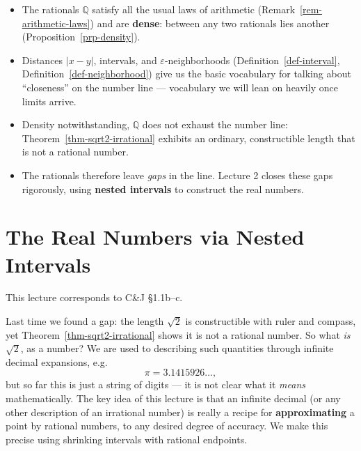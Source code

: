 \documentclass[
  letterpaper,
  DIV=11,
  numbers=noendperiod]{scrreprt}
\providecommand{\tightlist}{%
  \setlength{\itemsep}{0pt}\setlength{\parskip}{0pt}}
\theoremstyle{plain}
\theoremstyle{plain}
\theoremstyle{definition}
\theoremstyle{definition}
\theoremstyle{definition}
\theoremstyle{plain}
\theoremstyle{plain}
\theoremstyle{remark}
\begin{document}
\begin{itemize}
\tightlist
\item
  The rationals \(\mathbb{Q}\) satisfy all the usual laws of arithmetic
  (Remark~\ref{rem-arithmetic-laws}) and are \textbf{dense}: between any
  two rationals lies another (Proposition~\ref{prp-density}).
\item
  Distances \(|x-y|\), intervals, and \(\varepsilon\)-neighborhoods
  (Definition~\ref{def-interval}, Definition~\ref{def-neighborhood})
  give us the basic vocabulary for talking about ``closeness'' on the
  number line --- vocabulary we will lean on heavily once limits arrive.
\item
  Density notwithstanding, \(\mathbb{Q}\) does not exhaust the number
  line: Theorem~\ref{thm-sqrt2-irrational} exhibits an ordinary,
  constructible length that is not a rational number.
\item
  The rationals therefore leave \emph{gaps} in the line. Lecture 2
  closes these gaps rigorously, using \textbf{nested intervals} to
  construct the real numbers.
\end{itemize}

\chapter{The Real Numbers via Nested
Intervals}\label{the-real-numbers-via-nested-intervals}

\begin{tcolorbox}[enhanced jigsaw, arc=.35mm, bottomrule=.15mm, bottomtitle=1mm, breakable, colback=white, colbacktitle=quarto-callout-note-color!10!white, colframe=quarto-callout-note-color-frame, coltitle=black, left=2mm, leftrule=.75mm, opacityback=0, opacitybacktitle=0.6, rightrule=.15mm, title={Companion reading}, titlerule=0mm, toprule=.15mm, toptitle=1mm]

This lecture corresponds to C\&J §1.1b--c.

\end{tcolorbox}

Last time we found a gap: the length \(\sqrt2\) is constructible with
ruler and compass, yet Theorem~\ref{thm-sqrt2-irrational} shows it is
not a rational number. So what \emph{is} \(\sqrt2\), as a number? We are
used to describing such quantities through infinite decimal expansions,
e.g. \[
\pi = 3.1415926\ldots,
\] but so far this is just a string of digits --- it is not clear what
it \emph{means} mathematically. The key idea of this lecture is that an
infinite decimal (or any other description of an irrational number) is
really a recipe for \textbf{approximating} a point by rational numbers,
to any desired degree of accuracy. We make this precise using shrinking
intervals with rational endpoints.
\end{document}
